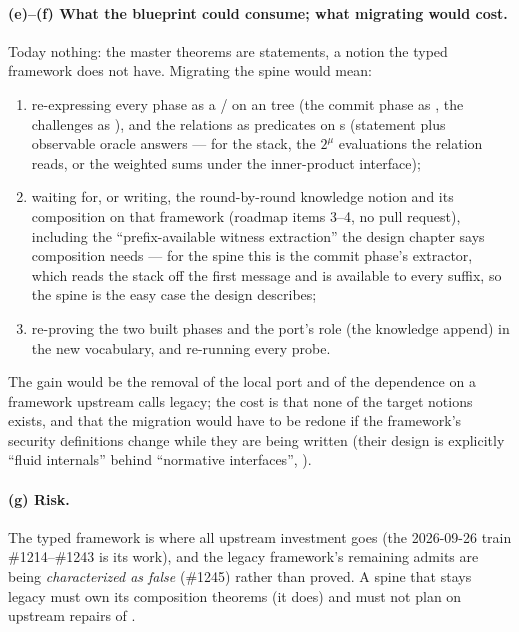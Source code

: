 \paragraph{(e)--(f) What the blueprint could consume; what migrating would cost.}
Today nothing: the master theorems are  statements, a
notion the typed framework does not have. Migrating the spine would mean:
\begin{enumerate}
\item re-expressing every phase as a / on an
   tree (the commit phase as
  , the challenges as ), and
  the relations as predicates on s (statement plus observable oracle answers
  --- for the stack, the $2^\mu$ evaluations the relation reads, or the weighted sums under the
  inner-product interface);
\item waiting for, or writing, the round-by-round knowledge notion and its composition on that
  framework (roadmap items 3--4, no pull request), including the ``prefix-available witness
  extraction'' the design chapter says composition needs --- for the spine this is the commit
  phase's extractor, which reads the stack off the first message and is available to every
  suffix, so the spine is the easy case the design describes;
\item re-proving the two built phases and the port's role (the knowledge append) in the new
  vocabulary, and re-running every probe.
\end{enumerate}
The gain would be the removal of the local port and of the dependence on a framework upstream
calls legacy; the cost is that none of the target notions exists, and that the migration would
have to be redone if the framework's security definitions change while they are being written
(their design is explicitly ``fluid internals'' behind ``normative interfaces'',
).

\paragraph{(g) Risk.}
The typed framework is where all upstream investment goes (the 2026-09-26 train
\#1214--\#1243 is its work), and the legacy framework's remaining admits are being
\emph{characterized as false} (\#1245) rather than proved. A spine that stays legacy must own
its composition theorems (it does) and must not plan on upstream repairs of
.

